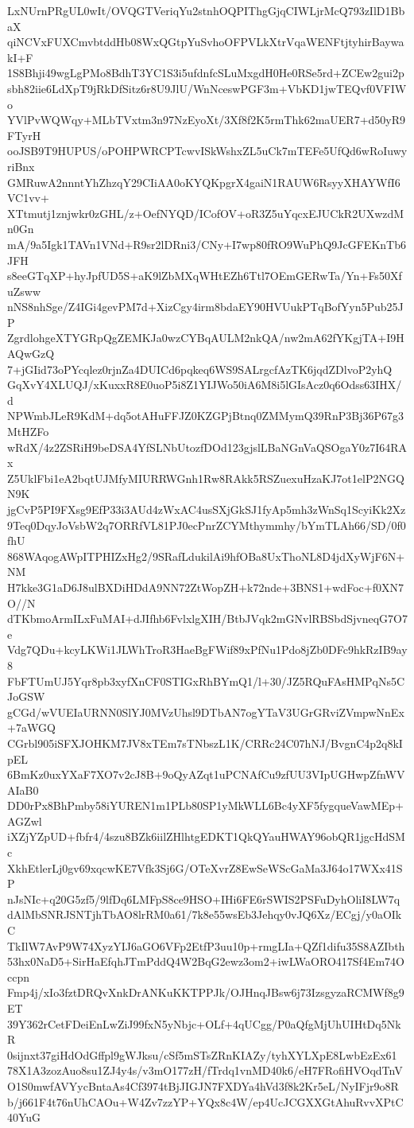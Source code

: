 LxNUrnPRgUL0wIt/OVQGTVeriqYu2stnhOQPIThgGjqCIWLjrMcQ793zIlD1BbaX
qiNCVxFUXCmvbtddHb08WxQGtpYuSvhoOFPVLkXtrVqaWENFtjtyhirBaywakI+F
1S8Bhji49wgLgPMo8BdhT3YC1S3i5ufdnfcSLuMxgdH0He0RSe5rd+ZCEw2gui2p
sbh82iie6LdXpT9jRkDfSitz6r8U9JlU/WnNceswPGF3m+VbKD1jwTEQvf0VFIWo
YVlPvWQWqy+MLbTVxtm3n97NzEyoXt/3Xf8f2K5rmThk62maUER7+d50yR9FTyrH
ooJSB9T9HUPUS/oPOHPWRCPTcwvISkWshxZL5uCk7mTEFe5UfQd6wRoIuwyriBnx
GMRuwA2nnntYhZhzqY29CIiAA0oKYQKpgrX4gaiN1RAUW6RsyyXHAYWfI6VC1vv+
XTtmutj1znjwkr0zGHL/z+OefNYQD/ICofOV+oR3Z5uYqcxEJUCkR2UXwzdMn0Gn
mA/9a5Igk1TAVn1VNd+R9sr2lDRni3/CNy+I7wp80fRO9WuPhQ9JcGFEKnTb6JFH
s8eeGTqXP+hyJpfUD5S+aK9lZbMXqWHtEZh6Ttl7OEmGERwTa/Yn+Fs50XfuZsww
nNS8nhSge/Z4IGi4gevPM7d+XizCgy4irm8bdaEY90HVUukPTqBofYyn5Pub25JP
ZgrdlohgeXTYGRpQgZEMKJa0wzCYBqAULM2nkQA/nw2mA62fYKgjTA+I9HAQwGzQ
7+jGIid73oPYcqlez0rjnZa4DUICd6pqkeq6WS9SALrgcfAzTK6jqdZDlvoP2yhQ
GqXvY4XLUQJ/xKuxxR8E0uoP5i8Z1YIJWo50iA6M8i5lGIsAcz0q6Odss63IHX/d
NPWmbJLeR9KdM+dq5otAHuFFJZ0KZGPjBtnq0ZMMymQ39RnP3Bj36P67g3MtHZFo
wRdX/4z2ZSRiH9beDSA4YfSLNbUtozfDOd123gjslLBaNGnVaQSOgaY0z7I64RAx
Z5UklFbi1eA2bqtUJMfyMIURRWGnh1Rw8RAkk5RSZuexuHzaKJ7ot1elP2NGQN9K
jgCvP5PI9FXsg9EfP33i3AUd4zWxAC4usSXjGkSJ1fyAp5mh3zWnSq1ScyiKk2Xz
9Teq0DqyJoVsbW2q7ORRfVL81PJ0ecPnrZCYMthymmhy/bYmTLAh66/SD/0f0fhU
868WAqogAWpITPHIZxHg2/9SRafLdukilAi9hfOBa8UxThoNL8D4jdXyWjF6N+NM
H7kke3G1aD6J8ulBXDiHDdA9NN72ZtWopZH+k72nde+3BNS1+wdFoc+f0XN7O//N
dTKbmoArmILxFuMAI+dJIfhb6FvlxlgXIH/BtbJVqk2mGNvlRBSbdSjvneqG7O7e
Vdg7QDu+kcyLKWi1JLWhTroR3HaeBgFWif89xPfNu1Pdo8jZb0DFc9hkRzIB9ay8
FbFTUmUJ5Yqr8pb3xyfXnCF0STIGxRhBYmQ1/l+30/JZ5RQuFAsHMPqNs5CJoGSW
gCGd/wVUEIaURNN0SlYJ0MVzUhsl9DTbAN7ogYTaV3UGrGRviZVmpwNnEx+7aWGQ
CGrbl905iSFXJOHKM7JV8xTEm7sTNbszL1K/CRRc24C07hNJ/BvgnC4p2q8kIpEL
6BmKz0uxYXaF7XO7v2cJ8B+9oQyAZqt1uPCNAfCu9zfUU3VIpUGHwpZfnWVAIaB0
DD0rPx8BhPmby58iYUREN1m1PLb80SP1yMkWLL6Bc4yXF5fygqueVawMEp+AGZwl
iXZjYZpUD+fbfr4/4szu8BZk6iilZHlhtgEDKT1QkQYauHWAY96obQR1jgcHdSMc
XkhEtlerLj0gv69xqcwKE7Vfk3Sj6G/OTeXvrZ8EwSeWScGaMa3J64o17WXx41SP
nJsNIc+q20G5zf5/9lfDq6LMFpS8ce9HSO+IHi6FE6rSWIS2PSFuDyhOliI8LW7q
dAlMbSNRJSNTjhTbAO8lrRM0a61/7k8e55wsEb3Jehqy0vJQ6Xz/ECgj/y0aOIkC
TkIlW7AvP9W74XyzYIJ6aGO6VFp2EtfP3uu10p+rmgLIa+QZf1difu35S8AZIbth
53hx0NaD5+SirHaEfqhJTmPddQ4W2BqG2ewz3om2+iwLWaORO417Sf4Em74Occpn
Fmp4j/xIo3fztDRQvXnkDrANKuKKTPPJk/OJHnqJBsw6j73IzsgyzaRCMWf8g9ET
39Y362rCetFDeiEnLwZiJ99fxN5yNbjc+OLf+4qUCgg/P0aQfgMjUhUIHtDq5NkR
0sijnxt37giHdOdGffpl9gWJksu/cSf5mSTsZRnKIAZy/tyhXYLXpE8LwbEzEx61
78X1A3zozAuo8su1ZJ4y4s/v3mO177zH/fTrdq1vnMD40k6/eH7FRofiHVOqdTnV
O1S0mwfAVYycBntaAs4Cf3974tBjJIGJN7FXDYa4hVd3f8k2Kr5eL/NyIFjr9o8R
b/j661F4t76nUhCAOu+W4Zv7zzYP+YQx8c4W/ep4UcJCGXXGtAhuRvvXPtC40YuG
